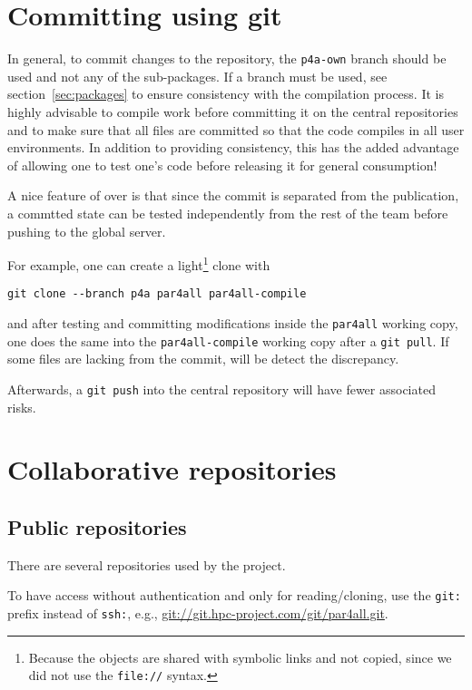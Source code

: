 \documentclass[a4paper]{article}
\begin{document}


\section{Committing using git}

In general, to commit changes to the \Agit repository, the
\texttt{p4a-own} branch should be used and not any of the \Apfa
sub-packages. If a branch must be used, see section~\ref{sec:packages}
to ensure consistency with the \Apfa compilation process. It is highly
advisable to compile work before
committing it on the central repositories and to make sure that all
files are committed so that the code compiles in all user
environments. In addition to providing
consistency, this has the added advantage of
allowing one to test one's code before releasing it for general
consumption! \smiley

A nice feature of \Agit over \Asvn is that since the commit is separated from
the publication, a commtted state can be tested independently from the
rest of the team before pushing to the global server.

For example, one can create a light\footnote{Because the objects are
  shared with symbolic links and not copied, since we did not use the
  \texttt{file://} syntax.} clone with
\begin{verbatim}
git clone --branch p4a par4all par4all-compile
\end{verbatim}
and after testing and committing modifications inside the
\texttt{par4all} working copy, one does the same into the
\texttt{par4all-compile} working copy after a \texttt{git pull}.
If some files are lacking from the commit, \Agit will be detect the discrepancy.

Afterwards, a \texttt{git push} into the central \Apfa
repository will have fewer associated risks.


\section{Collaborative repositories}
\label{sec:coll-repos}


\subsection{Public repositories}
\label{sec:public-repositories}

There are several \Agit repositories used by the project.

To have access without authentication and only for reading/cloning, use
the \texttt{git:} prefix instead of \texttt{ssh:}, e.g.,
\url{git://git.hpc-project.com/git/par4all.git}.
\end{document}
